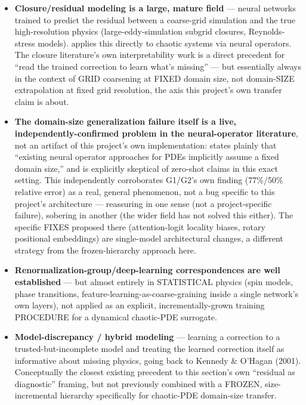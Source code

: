 \documentclass[11pt]{article}
\begin{document}
\begin{itemize}[nosep]
\item \textbf{Closure/residual modeling is a large, mature field}
  \cite{mlclosurereview2024} --- neural networks trained to predict the
  residual between a coarse-grid simulation and the true high-resolution
  physics (large-eddy-simulation subgrid closures, Reynolds-stress
  models). \cite{coarsegrainneuralop2024} applies this directly to
  chaotic systems via neural operators. The closure literature's own
  interpretability work is a direct precedent for ``read the trained
  correction to learn what's missing'' --- but essentially always in the
  context of GRID coarsening at FIXED domain size, not domain-SIZE
  extrapolation at fixed grid resolution, the axis this project's own
  transfer claim is about.
\item \textbf{The domain-size generalization failure itself is a live,
  independently-confirmed problem in the neural-operator literature},
  not an artifact of this project's own implementation:
  \cite{zeroshotlargerdomains2026} states plainly that ``existing neural
  operator approaches for PDEs implicitly assume a fixed domain size,''
  and \cite{falsepromisezeroshot2026} is explicitly skeptical of
  zero-shot claims in this exact setting. This independently corroborates
  G1/G2's own finding (77\%/50\% relative error) as a real, general
  phenomenon, not a bug specific to this project's architecture ---
  reassuring in one sense (not a project-specific failure), sobering in
  another (the wider field has not solved this either). The specific
  FIXES proposed there (attention-logit locality biases, rotary
  positional embeddings) are single-model architectural changes, a
  different strategy from the frozen-hierarchy approach here.
\item \textbf{Renormalization-group/deep-learning correspondences are
  well established} \cite{mehtaschwab2014,mlrgstatphys2023} --- but
  almost entirely in STATISTICAL physics (spin models, phase
  transitions, feature-learning-as-coarse-graining inside a single
  network's own layers), not applied as an explicit, incrementally-grown
  training PROCEDURE for a dynamical chaotic-PDE surrogate.
\item \textbf{Model-discrepancy / hybrid modeling}
  \cite{kennedyohagan2001,discrepancyframework2022} --- learning a
  correction to a trusted-but-incomplete model and treating the learned
  correction itself as informative about missing physics, going back to
  Kennedy \& O'Hagan (2001). Conceptually the closest existing precedent
  to this section's own ``residual as diagnostic'' framing, but not
  previously combined with a FROZEN, size-incremental hierarchy
  specifically for chaotic-PDE domain-size transfer.
\end{itemize}
\end{document}
